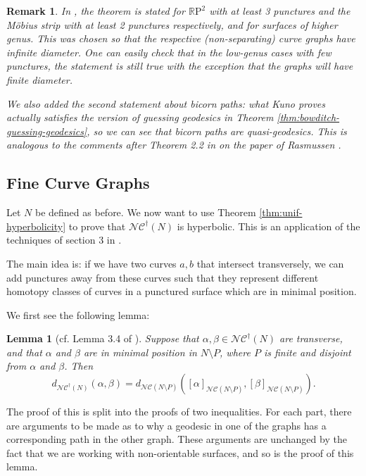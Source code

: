 \documentclass[10pt,a4paper]{amsart}
\newtheorem{remark}[theorem]{Remark}
\newtheorem{lemma}[theorem]{Lemma}
\newcommand{\rp}{\mathbb{R}\mathrm{P}^2}
\newcommand{\ncg}{\mathcal{NC}}
\newcommand{\fncg}{\mathcal{NC}^\dagger}
\begin{document}
\begin{remark}
    In \cite{kuno-hyperbolicity}, the theorem is stated for $\rp$ with at least 3 punctures and the Möbius strip with at least 2 punctures respectively, and for surfaces of higher genus.
    This was chosen so that the respective (non-separating) curve graphs have infinite diameter.
    One can easily check that in the low-genus cases with few punctures, the statement is still true with the exception that the graphs will have finite diameter.

    We also added the second statement about bicorn paths:
    what Kuno proves actually satisfies the version of guessing geodesics in Theorem \ref{thm:bowditch-guessing-geodesics}, so we can see that bicorn paths are quasi-geodesics.
    This is analogous to the comments after Theorem 2.2 in \cite{BHW2} on the paper of Rasmussen \cite{rasmussen}.
\end{remark}

\subsection{Fine Curve Graphs}
Let $N$ be defined as before.
We now want to use Theorem \ref{thm:unif-hyperbolicity} to prove that $\fncg(N)$ is hyperbolic.
This is an application of the techniques of section 3 in \cite{BHW1}.

The main idea is: 
if we have two curves $a,b$ that intersect transversely, we can add punctures away from these curves such that they represent different homotopy classes of curves in a punctured surface which are in minimal position.

We first see the following lemma:
\begin{lemma}[cf. Lemma 3.4 of \cite{BHW1}]\label{lem:approx-by-NC}
    Suppose that $\alpha,\beta \in \fncg(N)$ are transverse, and that $\alpha$ and $\beta$ are in minimal position in $N\setminus P$, where $P$ is finite and disjoint from $\alpha$ and $\beta$.
    Then
    \[ d_{\fncg(N)}(\alpha,\beta) = d_{\ncg(N\setminus P)}([\alpha]_{\ncg(N\setminus P)},[\beta]_{\ncg(N\setminus P)}) .\]
\end{lemma}

The proof of this is split into the proofs of two inequalities.
For each part, there are arguments to be made as to why a geodesic in one of the graphs has a corresponding path in the other graph.
These arguments are unchanged by the fact that we are working with non-orientable surfaces, and so is the proof of this lemma.
\end{document}
